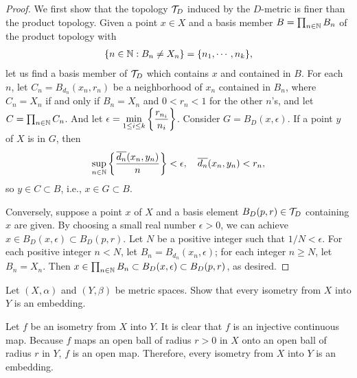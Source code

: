 \begin{proof}
    We first show that the topology ${\mathcal{T}}_D$ induced by the $D$-metric is finer than the product topology.
    Given a point $x\in X$ and a basis member $B=\prod_{n\in{\mathbb{N}}}B_n$ of the product topology with
    \begin{align*}
        \displaystyle{\{n\in{\mathbb{N}}:B_n\neq X_n\}=\{n_1, \cdots, n_k\}},
    \end{align*}
    let us find a basis member of ${\mathcal{T}}_D$ which contains $x$ and contained in $B$.
    For each $n$, let $C_n=B_{d_n}(x_n, r_n)$ be a neighborhood of $x_n$ contained in $B_n$, where $C_n=X_n$ if and only if $B_n=X_n$ and $0<r_n<1$ for the other $n$'s, and let $C=\prod_{n\in{\mathbb{N}}}C_n$.
    And let $\displaystyle{\epsilon=\min_{1\leq i\leq k}\left\{\frac{r_{n_i}}{n_i}\right\}}$.
    Consider $G=B_D(x, \epsilon)$.
    If a point $y$ of $X$ is in $G$, then
    \begin{align*}
        \sup_{n\in{\mathbb{N}}}\left\{\frac{\overline{d_n}(x_n, y_n)}{n}\right\} < \epsilon,\quad\overline{d_n}(x_n, y_n) < r_n,
    \end{align*}
    so $y\in C\subset B$, i.e., $x\in G\subset B$.
    
    Conversely, suppose a point $x$ of $X$ and a basis element $B_D(p, r)\in {\mathcal{T}}_D$ containing $x$ are given.
    By choosing a small real number $\epsilon>0$, we can achieve $x\in B_D(x, \epsilon)\subset B_D(p, r)$.
    Let $N$ be a positive integer such that $1/N < \epsilon$.
    For each positive integer $n<N$, let $B_n=B_{d_n}(x_n, \epsilon)$; for each integer $n\geq N$, let $B_n=X_n$.
    Then $x\in\prod_{n\in{\mathbb{N}}}B_n\subset B_D(x, \epsilon)\subset B_D(p, r)$, as desired.
\end{proof}

\begin{prob}
    Let $(X, \alpha)$ and $(Y, \beta)$ be metric spaces.
    Show that every isometry from $X$ into $Y$ is an embedding.
\end{prob}
\begin{sol}
    Let $f$ be an isometry from $X$ into $Y$.
    It is clear that $f$ is an injective continuous map.
    Because $f$ maps an open ball of radius $r>0$ in $X$ onto an open ball of radius $r$ in $Y$, $f$ is an open map.
    Therefore, every isometry from $X$ into $Y$ is an embedding.
\end{sol}

